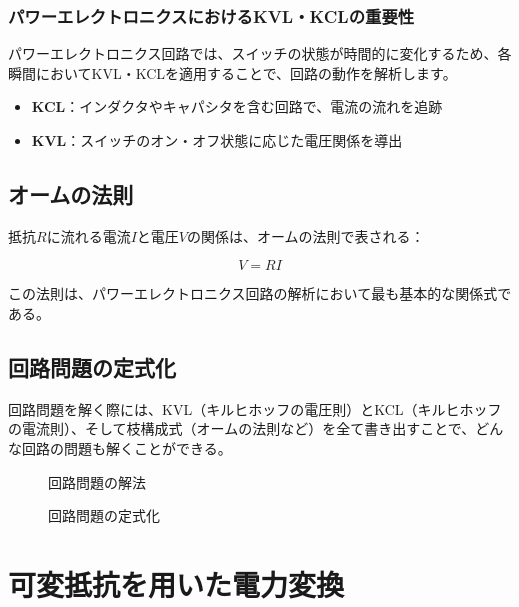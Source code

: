 \subsubsection{パワーエレクトロニクスにおけるKVL・KCLの重要性}

パワーエレクトロニクス回路では、スイッチの状態が時間的に変化するため、各瞬間においてKVL・KCLを適用することで、回路の動作を解析します。

\begin{itemize}
\item \textbf{KCL}：インダクタやキャパシタを含む回路で、電流の流れを追跡
\item \textbf{KVL}：スイッチのオン・オフ状態に応じた電圧関係を導出
\end{itemize}

\subsection{オームの法則}

抵抗$R$に流れる電流$I$と電圧$V$の関係は、オームの法則で表される：

\begin{equation}
V = RI
\end{equation}

この法則は、パワーエレクトロニクス回路の解析において最も基本的な関係式である。

\subsection{回路問題の定式化}

回路問題を解く際には、KVL（キルヒホッフの電圧則）とKCL（キルヒホッフの電流則）、そして枝構成式（オームの法則など）を全て書き出すことで、どんな回路の問題も解くことができる。

\begin{figure}[H]
\centering
{}
\caption{回路問題の解法}
\label{fig:circuit_solution}
\end{figure}

\begin{figure}[H]
\centering
{}
\caption{回路問題の定式化}
\label{fig:circuit_formulation}
\end{figure}

\section{可変抵抗を用いた電力変換}

